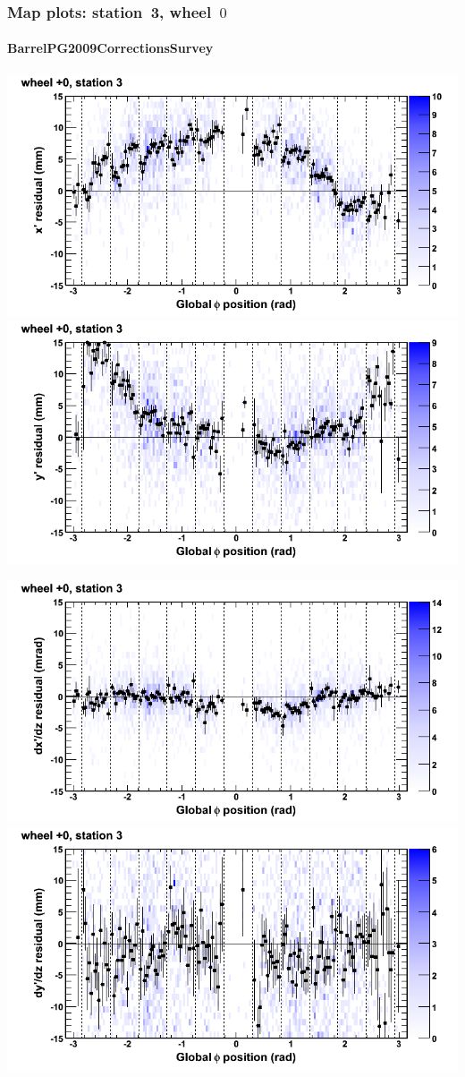 \documentclass[compress]{beamer}
\begin{document}
\begin{frame}
\frametitle{Map plots: station~3, wheel~$0$}
\framesubtitle{BarrelPG2009CorrectionsSurvey}
\includegraphics[width=0.5\linewidth]{mapplots_01/DTvsphi_st3whC_x.png}
\includegraphics[width=0.5\linewidth]{mapplots_01/DTvsphi_st3whC_y.png}

\includegraphics[width=0.5\linewidth]{mapplots_01/DTvsphi_st3whC_dxdz.png}
\includegraphics[width=0.5\linewidth]{mapplots_01/DTvsphi_st3whC_dydz.png}
\end{frame}
\end{document}
